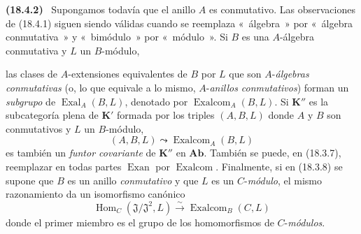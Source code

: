 \documentclass[10pt,oneside]{book}
\makeatletter
\newcommand{\setmanualcurrentlabel}[1]{\def\@currentlabel{#1}}
\newcommand{\oldpage}[2][]{%
  \setcounter{footnote}{0}%
  \marginpar{\scriptsize\textbf{#1}~|~#2}\ignorespaces}
\newenvironment{env}[1][]{\setmanualcurrentlabel{#1}\par\medskip\noindent\textbf{(#1)}\ }{\par}
\makeatother
\begin{document}
\begin{env}[18.4.2]
\label{0.18.4.2-es}
Supongamos todavía que el anillo $A$ es conmutativo. Las observaciones de (18.4.1) siguen
siendo válidas cuando se reemplaza «~álgebra~» por «~álgebra conmutativa~» y
«~bimódulo~» por «~módulo~». Si $B$ es una $A$-álgebra conmutativa y $L$ un
$B$-módulo,

\oldpage[0\textsubscript{IV-1}]{65}

las clases de $A$-extensiones equivalentes de $B$ por $L$ que son
$A$-\emph{álgebras conmutativas} (o, lo que equivale a lo mismo,
$A$-\emph{anillos conmutativos}) forman un \emph{subgrupo} de
$\operatorname{Exal}_A(B,L)$, denotado por $\operatorname{Exalcom}_A(B,L)$. Si
$\boldsymbol{K}''$ es la subcategoría plena de $\boldsymbol{K}'$ formada por los triples
$(A,B,L)$ donde $A$ y $B$ son conmutativos y $L$ un $B$-módulo,
\[
  (A,B,L)\leadsto\operatorname{Exalcom}_A(B,L)
\]
es también un \emph{funtor covariante} de $\boldsymbol{K}''$ en $\boldsymbol{Ab}$. También se
puede, en (18.3.7), reemplazar en todas partes $\operatorname{Exan}$ por
$\operatorname{Exalcom}$. Finalmente, si en (18.3.8) se supone que $B$ es un
anillo \emph{conmutativo} y que $L$ es un $C$-\emph{módulo}, el mismo
razonamiento da un isomorfismo canónico
\begin{equation}
\label{0.18.4.2.1-es}
\tag{18.4.2.1}
  \operatorname{Hom}_C(\mathfrak J/\mathfrak J^2,L)
  \xrightarrow{\sim}\operatorname{Exalcom}_B(C,L)
\end{equation}
donde el primer miembro es el grupo de los homomorfismos de $C$-\emph{módulos}.
\end{env}
\end{document}
